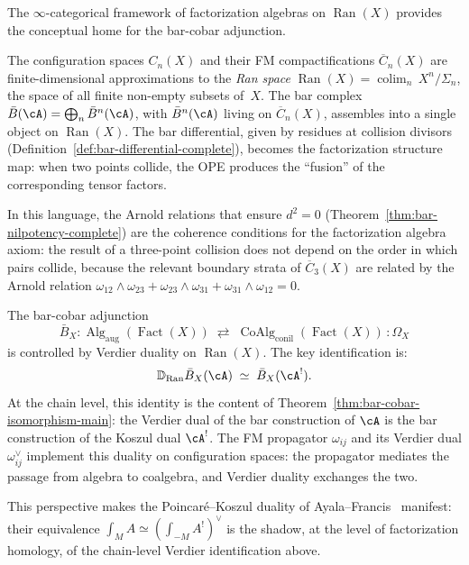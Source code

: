 The $\infty$-categorical framework of factorization
algebras on $\operatorname{Ran}(X)$ provides the conceptual home for
the bar-cobar adjunction.

\begin{remark}\label{rem:config-to-ran}
The configuration spaces $C_n(X)$ and their FM compactifications
$\overline{C}_n(X)$ are finite-dimensional approximations to the
\emph{Ran space} $\operatorname{Ran}(X) = \operatorname{colim}_n\,
X^n / \Sigma_n$, the space of all finite non-empty subsets of~$X$.
The bar complex $\bar{B}(\cA) = \bigoplus_n \bar{B}^n(\cA)$, with
$\bar{B}^n(\cA)$ living on $\overline{C}_n(X)$, assembles into a
single object on $\operatorname{Ran}(X)$.  The bar differential,
given by residues at collision divisors
(Definition~\ref{def:bar-differential-complete}), becomes the
factorization structure map: when two points collide, the OPE
produces the ``fusion'' of the corresponding tensor factors.

In this language, the Arnold relations that ensure $d^2 = 0$
(Theorem~\ref{thm:bar-nilpotency-complete}) are the coherence conditions
for the factorization algebra axiom: the result of a three-point
collision does not depend on the order in which pairs collide,
because the relevant boundary strata of $\overline{C}_3(X)$ are
related by the Arnold relation
$\omega_{12} \wedge \omega_{23} + \omega_{23} \wedge \omega_{31}
+ \omega_{31} \wedge \omega_{12} = 0$.
\end{remark}

\begin{remark}\label{rem:verdier-engine}
The bar-cobar adjunction
\[
\bar{B}_X \colon
\operatorname{Alg}_{\mathrm{aug}}(\operatorname{Fact}(X))
\;\rightleftarrows\;
\operatorname{CoAlg}_{\mathrm{conil}}(\operatorname{Fact}(X))
\,:\!\Omega_X
\]
is controlled by Verdier duality on $\operatorname{Ran}(X)$.
The key identification is:
\[
\mathbb{D}_{\operatorname{Ran}} \bar{B}_X(\cA) \;\simeq\; \bar{B}_X(\cA^!).
\]
At the chain level, this identity is the content of
Theorem~\ref{thm:bar-cobar-isomorphism-main}: the Verdier dual of the
bar construction of $\cA$ is the bar construction of the Koszul dual
$\cA^!$.  The FM propagator $\omega_{ij}$ and its Verdier dual
$\omega_{ij}^\vee$ implement this duality on configuration spaces:
the propagator mediates the passage from algebra to coalgebra, and
Verdier duality exchanges the two.

This perspective makes the Poincar\'e--Koszul duality of
Ayala--Francis~\cite{AF15} manifest: their equivalence
$\int_M A \simeq (\int_{-M} A^!)^\vee$ is the shadow, at the level
of factorization homology, of the chain-level Verdier identification
above.
\end{remark}

